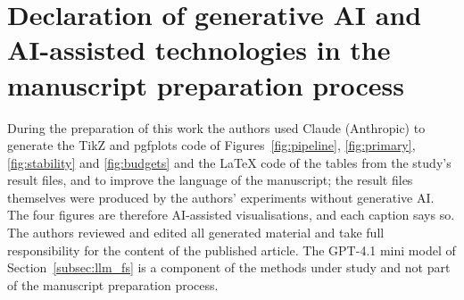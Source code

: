 \documentclass[final,5p,twocolumn]{elsarticle}
\begin{document}
\section*{Declaration of generative AI and AI-assisted technologies in the manuscript preparation process}
During the preparation of this work the authors used Claude (Anthropic) to generate the TikZ and pgfplots code of Figures~\ref{fig:pipeline}, \ref{fig:primary}, \ref{fig:stability} and \ref{fig:budgets} and the LaTeX code of the tables from the study's result files, and to improve the language of the manuscript; the result files themselves were produced by the authors' experiments without generative AI. The four figures are therefore AI-assisted visualisations, and each caption says so. The authors reviewed and edited all generated material and take full responsibility for the content of the published article. The GPT-4.1 mini model of Section~\ref{subsec:llm_fs} is a component of the methods under study and not part of the manuscript preparation process.
\end{document}
